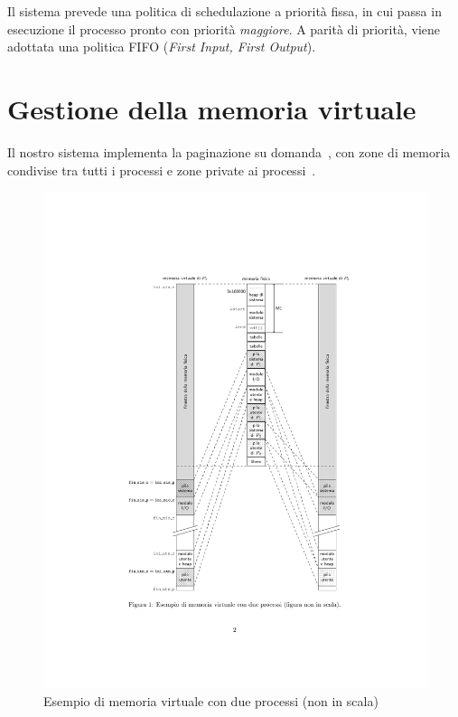 Il sistema prevede una politica di schedulazione a priorità fissa, in cui passa in esecuzione il processo pronto con priorità \emph{maggiore}. A parità di priorità, viene adottata una politica FIFO (\emph{First Input, First Output}).

\section{Gestione della memoria virtuale}
Il nostro sistema implementa la paginazione su domanda~\cite{lettieri:paginazione-su-domanda}, con zone di memoria condivise tra tutti i processi e zone private ai processi~\cite{lettieri:paginazione-nel-nucleo}.

\begin{figure}
	\centering
	\includegraphics[width=\textwidth]{"img/memoria-virtuale-nucleo.pdf"}
	\caption{Esempio di memoria virtuale con due processi (non in scala)~\cite{lettieri:paginazione-nel-nucleo}}
	\label{fig:memoria-virtuale-nucleo}
\end{figure}

